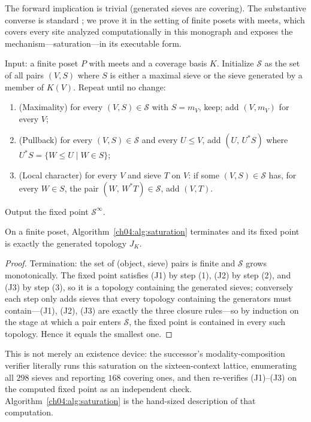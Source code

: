 The forward implication is trivial (generated sieves are covering). The
substantive converse is standard \cite{stacks00ZC,maclane}; we prove it in the
setting of finite posets with meets, which covers every site analyzed
computationally in this monograph and exposes the mechanism---saturation---in
its executable form.

\begin{algorithm}\label{ch04:alg:saturation}
Input: a finite poset $P$ with meets and a coverage basis $K$. Initialize
$\mathcal{S}$ as the set of all pairs $(V,S)$ where $S$ is either a maximal
sieve or the sieve generated by a member of $K(V)$. Repeat until no change:
\begin{enumerate}
\item (Maximality) for every $(V,S)\in\mathcal{S}$ with $S=m_V$, keep;
add $(V,m_V)$ for every $V$;
\item (Pullback) for every $(V,S)\in\mathcal{S}$ and every $U\le V$, add
$(U,\,U^{*}S)$ where $U^{*}S=\{W\le U \mid W\in S\}$;
\item (Local character) for every $V$ and sieve $T$ on $V$: if some
$(V,S)\in\mathcal{S}$ has, for every $W\in S$, the pair
$(W,\,W^{*}T)\in\mathcal{S}$, add $(V,T)$.
\end{enumerate}
Output the fixed point $\mathcal{S}^{\infty}$.
\end{algorithm}

\begin{lemma}\label{ch04:lem:saturation}
On a finite poset, Algorithm~\ref{ch04:alg:saturation} terminates and its
fixed point is exactly the generated topology $J_K$.
\end{lemma}

\begin{proof}
Termination: the set of (object, sieve) pairs is finite and $\mathcal{S}$
grows monotonically. The fixed point satisfies (J1) by step (1), (J2) by step
(2), and (J3) by step (3), so it is a topology containing the generated
sieves; conversely each step only adds sieves that every topology containing
the generators must contain---(J1), (J2), (J3) are exactly the three
closure rules---so by induction on the stage at which a pair enters
$\mathcal{S}$, the fixed point is contained in every such topology. Hence it
equals the smallest one.
\end{proof}

This is not merely an existence device: the successor's modality-composition
verifier literally runs this saturation on the sixteen-context lattice,
enumerating all $298$ sieves and reporting $168$ covering ones, and then
re-verifies (J1)--(J3) on the computed fixed point as an independent check.
Algorithm~\ref{ch04:alg:saturation} is the hand-sized description of that
computation.

